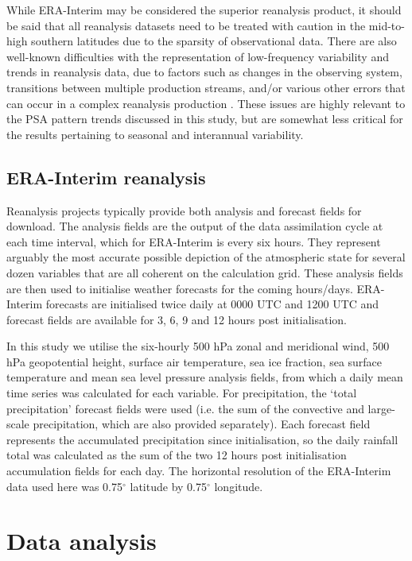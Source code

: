 While ERA-Interim may be considered the superior reanalysis product, it should be said that all reanalysis datasets need to be treated with caution in the mid-to-high southern latitudes due to the sparsity of observational data. There are also well-known difficulties with the representation of low-frequency variability and trends in reanalysis data, due to factors such as changes in the observing system, transitions between multiple production streams, and/or various other errors that can occur in a complex reanalysis production \citep{Dee2014}. These issues are highly relevant to the PSA pattern trends discussed in this study, but are somewhat less critical for the results pertaining to seasonal and interannual variability.

\subsection{ERA-Interim reanalysis}

Reanalysis projects typically provide both analysis and forecast fields for download. The analysis fields are the output of the data assimilation cycle at each time interval, which for ERA-Interim is every six hours. They represent arguably the most accurate possible depiction of the atmospheric state for several dozen variables that are all coherent on the calculation grid. These analysis fields are then used to initialise weather forecasts for the coming hours/days. ERA-Interim forecasts are initialised twice daily at 0000 UTC and 1200 UTC and forecast fields are available for 3, 6, 9 and 12 hours post initialisation.  

In this study we utilise the six-hourly 500 hPa zonal and meridional wind, 500 hPa geopotential height, surface air temperature, sea ice fraction, sea surface temperature and mean sea level pressure analysis fields, from which a daily mean time series was calculated for each variable. For precipitation, the `total precipitation' forecast fields were used (i.e. the sum of the convective and large-scale precipitation, which are also provided separately). Each forecast field represents the accumulated precipitation since initialisation, so the daily rainfall total was calculated as the sum of the two 12 hours post initialisation accumulation fields for each day. The horizontal resolution of the ERA-Interim data used here was 0.75$^{\circ}$ latitude by 0.75$^{\circ}$ longitude. 


\section{Data analysis}

